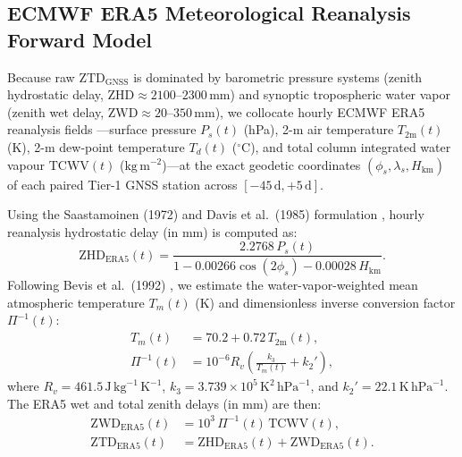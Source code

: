 ﻿\documentclass[journal]{IEEEtran}
\begin{document}
\subsection{ECMWF ERA5 Meteorological Reanalysis Forward Model}
Because raw $\text{ZTD}_{\text{GNSS}}$ is dominated by barometric pressure systems (zenith hydrostatic delay, $\text{ZHD} \approx 2100\text{--}2300$\,mm) and synoptic tropospheric water vapor (zenith wet delay, $\text{ZWD} \approx 20\text{--}350$\,mm), we collocate hourly ECMWF ERA5 reanalysis fields \cite{hersbach2020}---surface pressure $P_s(t)$ (hPa), 2-m air temperature $T_{2\text{m}}(t)$ (K), 2-m dew-point temperature $T_d(t)$ ($^\circ\text{C}$), and total column integrated water vapour $\text{TCWV}(t)$ ($\text{kg}\,\text{m}^{-2}$)---at the exact geodetic coordinates $(\phi_s, \lambda_s, H_{\text{km}})$ of each paired Tier-1 GNSS station across $[-45\,\text{d}, +5\,\text{d}]$.

Using the Saastamoinen (1972) and Davis et al.\ (1985) formulation \cite{saastamoinen1972,davis1985}, hourly reanalysis hydrostatic delay (in mm) is computed as:
\begin{equation}
    \text{ZHD}_{\text{ERA5}}(t) = \frac{2.2768 \, P_s(t)}{1 - 0.00266 \cos(2\phi_s) - 0.00028 \, H_{\text{km}}}.
    \label{eq:zhd}
\end{equation}
Following Bevis et al.\ (1992) \cite{bevis1992}, we estimate the water-vapor-weighted mean atmospheric temperature $T_m(t)$ (K) and dimensionless inverse conversion factor $\Pi^{-1}(t)$:
\begin{align}
    T_m(t) &= 70.2 + 0.72 \, T_{2\text{m}}(t), \label{eq:tm} \\
    \Pi^{-1}(t) &= 10^{-6} R_v \left(\frac{k_3}{T_m(t)} + k_2'\right), \label{eq:pi_inv}
\end{align}
where $R_v = 461.5\,\text{J}\,\text{kg}^{-1}\,\text{K}^{-1}$, $k_3 = 3.739 \times 10^5\,\text{K}^2\,\text{hPa}^{-1}$, and $k_2' = 22.1\,\text{K}\,\text{hPa}^{-1}$. The ERA5 wet and total zenith delays (in mm) are then:
\begin{align}
    \text{ZWD}_{\text{ERA5}}(t) &= 10^3 \, \Pi^{-1}(t) \, \text{TCWV}(t), \label{eq:zwd} \\
    \text{ZTD}_{\text{ERA5}}(t) &= \text{ZHD}_{\text{ERA5}}(t) + \text{ZWD}_{\text{ERA5}}(t). \label{eq:ztd_era5}
\end{align}
\end{document}
